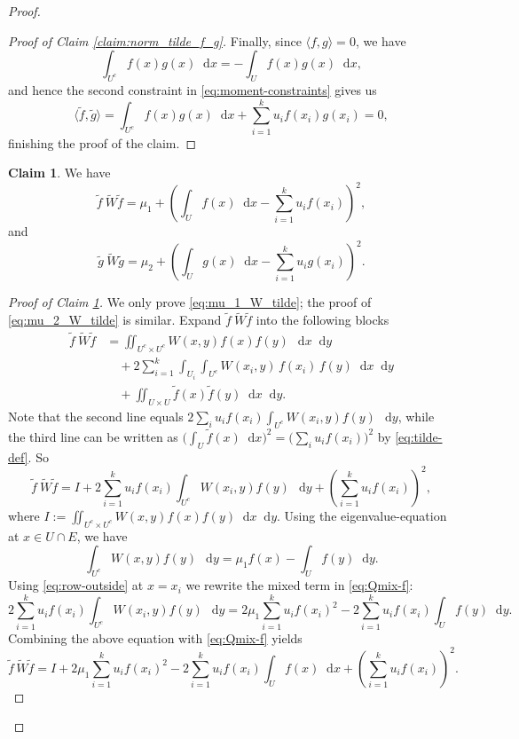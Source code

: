 \documentclass[11pt]{article}
\theoremstyle{plain}
\theoremstyle{definition}
\newtheorem{claim}{Claim}[section]
\numberwithin{equation}{section}
\newcommand{\dif}{\mathop{}\!\mathrm{d}}
\begin{document}
\begin{proof}
\begin{proof}[Proof of Claim \ref{claim:norm_tilde_f_g}]
Finally, since $\langle f,g\rangle=0$, we have 
\[
\int_{U^c} f(x)g(x) \dif{x} = -\int_U f(x)g(x) \dif{x},
\]
and hence the second constraint in \eqref{eq:moment-constraints} gives us
\[
\langle \tilde f,\tilde g\rangle
= \int_{U^c} f(x)g(x) \dif{x} + \sum_{i=1}^k u_i f(x_i)g(x_i)=0,
\]
finishing the proof of the claim.
\end{proof}

\begin{claim}\label{claim:tilde_fWf}
We have
\begin{equation}\label{eq:mu_1_W_tilde}
\tilde f\ \widetilde{W}\tilde f = \mu_1+\left(\int_U f(x) \dif{x} -\sum_{i=1}^k u_i f(x_i)\right)^2,
\end{equation}
and 
\begin{equation}\label{eq:mu_2_W_tilde}
\tilde g\ \widetilde{W}\tilde g 
=\mu_2+\left(\int_U g(x) \dif x -\sum_{i=1}^k u_i g(x_i)\right)^2.
\end{equation}
\end{claim}

\begin{proof}[Proof of Claim \ref{claim:tilde_fWf}]
We only prove \eqref{eq:mu_1_W_tilde}; the proof of \eqref{eq:mu_2_W_tilde} is similar. 
Expand $\tilde f\ \widetilde{W}\tilde f$ into the following blocks
\begin{align*}
\tilde f\ \widetilde{W}\tilde f
& =\iint_{U^c\times U^c} W(x,y)f(x)f(y)\,\dif{x} \dif{y} \\
& \quad + 2\sum_{i=1}^k \int_{U_i}\int_{U^c} W(x_i,y)\, f(x_i)\, f(y) \dif{x} \dif{y} \\
& \quad + \iint_{U\times U} \tilde f(x)\tilde f(y) \dif{x} \dif{y}.
\end{align*}
Note that the second line equals $2\sum_i u_i f(x_i)\int_{U^c} W(x_i,y)f(y)\,\dif y$, while the third line can be written as
$\big(\int_U \tilde f(x) \dif x \big)^2 = \big(\sum_i u_i f(x_i)\big)^2$ by \eqref{eq:tilde-def}. So
\begin{equation}\label{eq:Qmix-f}
\tilde f\ \widetilde{W}\tilde f
= I+2\sum_{i=1}^k u_i f(x_i)\int_{U^c} W(x_i,y)f(y)\,\dif{y} + \left(\sum_{i=1}^k u_i f(x_i)\right)^2,
\end{equation}
where $I:=\iint_{U^c\times U^c} W(x,y) f(x) f(y) \dif{x} \dif{y}$. Using the 
eigenvalue-equation at $x\in U\cap E$, we have 
\begin{equation}\label{eq:row-outside}
\int_{U^c} W(x,y)f(y)\,\dif{y} = \mu_1 f(x)-\int_U f(y) \dif{y}.
\end{equation}
Using \eqref{eq:row-outside} at $x=x_i$ we rewrite the mixed term in \eqref{eq:Qmix-f}:
\[
2\sum_{i=1}^k u_i f(x_i) \int_{U^c}W(x_i,y)f(y)\,\dif{y} 
= 2\mu_1\sum_{i=1}^k u_i f(x_i)^2 - 2\sum_{i=1}^k u_i f(x_i)\int_U f(y) \dif{y}. 
\]
Combining the above equation with \eqref{eq:Qmix-f} yields
\begin{equation}\label{eq:Qmix-f-2}
\tilde f\, \widetilde{W}\tilde f
= I + 2\mu_1\sum_{i=1}^k u_i f(x_i)^2-2\sum_{i=1}^k u_i f(x_i)\int_U f(x)\dif{x}+\left(\sum_{i=1}^k u_i f(x_i)\right)^2.
\end{equation}


\end{proof}
\end{proof}
\end{document}
